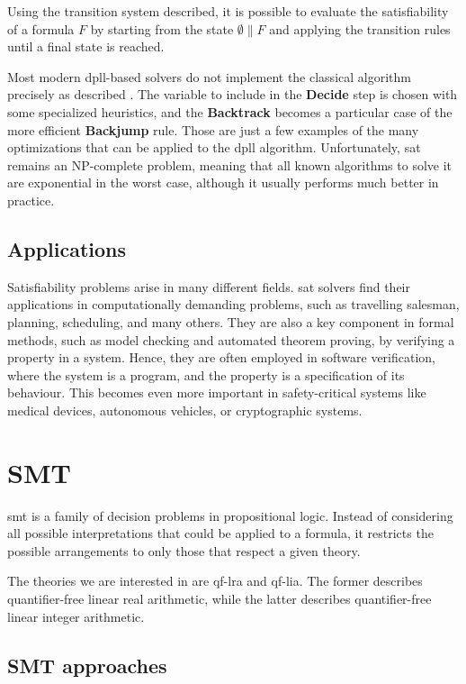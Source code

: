 Using the transition system described, it is possible to evaluate the satisfiability of a formula $F$ by starting from the state $\emptyset \parallel F$ and applying the transition rules until a final state is reached.

Most modern \gls{dpll}-based solvers do not implement the classical algorithm precisely as described \cite{paper:dpll(t)}.
The variable to include in the \textbf{Decide} step is chosen with some specialized heuristics, and the \textbf{Backtrack} becomes a particular case of the more efficient \textbf{Backjump} rule.
Those are just a few examples of the many optimizations that can be applied to the \gls{dpll} algorithm.
Unfortunately, \gls{sat} remains an NP-complete problem, meaning that all known algorithms to solve it are exponential in the worst case, although it usually performs much better in practice.

\subsection*{Applications}

Satisfiability problems arise in many different fields.
\gls{sat} solvers find their applications in computationally demanding problems, such as travelling salesman, planning, scheduling, and many others.
They are also a key component in formal methods, such as model checking and automated theorem proving, by verifying a property in a system.
Hence, they are often employed in software verification, where the system is a program, and the property is a specification of its behaviour.
This becomes even more important in safety-critical systems like medical devices, autonomous vehicles, or cryptographic systems.

\section{SMT}

\gls{smt} is a family of decision problems in propositional logic.
Instead of considering all possible interpretations that could be applied to a formula, it restricts the possible arrangements to only those that respect a given theory.

The theories we are interested in are \gls{qf-lra} and \gls{qf-lia}.
The former describes quantifier-free linear real arithmetic, while the latter describes quantifier-free linear integer arithmetic.

\subsection*{SMT approaches}


